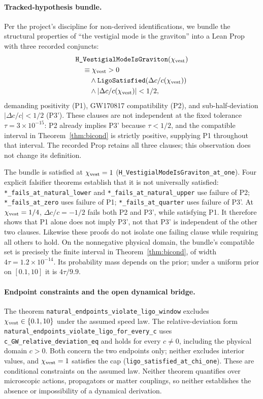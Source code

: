 \documentclass[aps,prl,reprint,nofootinbib,superscriptaddress]{revtex4-2}
\newcommand{\chivest}{\chi_{\rm vest}}
\newcommand{\dccap}{\Delta c/c}
\begin{document}
\paragraph{Tracked-hypothesis bundle.} Per the project's discipline
for non-derived identifications, we bundle the structural properties
of ``the vestigial mode is the graviton'' into a Lean Prop with
three recorded conjuncts:
\begin{equation*}
  \begin{aligned}
    &\verb|H_VestigialModeIsGraviton|(\chivest) \\
    &\quad \equiv \chivest > 0 \\
    &\qquad \wedge \verb|LigoSatisfied|(\dccap(\chivest)) \\
    &\qquad \wedge |\dccap(\chivest)| < 1/2,
  \end{aligned}
\end{equation*}
demanding positivity (P1), GW170817 compatibility (P2), and
sub-half-deviation $|\dccap| < 1/2$ (P3'). These clauses are not
independent at the fixed tolerance $\tau=3\times10^{-15}$:
P2 already implies P3' because $\tau<1/2$, and the compatible
interval in Theorem~\ref{thm:bicond} is strictly positive, supplying
P1 throughout that interval. The recorded Prop retains all three
clauses; this observation does not change its definition.

The bundle is satisfied at $\chivest=1$
(\texttt{H\_VestigialModeIsGraviton\_at\_one}). Four explicit
falsifier theorems establish that it is not universally satisfied:
\verb|*_fails_at_natural_lower| and \verb|*_fails_at_natural_upper|
use failure of P2; \verb|*_fails_at_zero| uses failure of P1;
\verb|*_fails_at_quarter| uses failure of P3'. At $\chivest=1/4$,
$\dccap=-1/2$ fails both P2 and P3', while satisfying P1.
It therefore shows that P1 alone does not imply P3', not that P3'
is independent of the other two clauses. Likewise these proofs do
not isolate one failing clause while requiring all others to hold.
On the nonnegative physical domain, the bundle's compatible set is
precisely the finite interval in Theorem~\ref{thm:bicond}, of width
$4\tau=1.2\times10^{-14}$. Its probability mass depends on the prior;
under a uniform prior on $[0.1,10]$ it is $4\tau/9.9$.

\paragraph{Endpoint constraints and the open dynamical bridge.}
The theorem \texttt{natural\_endpoints\_violate\_ligo\_window}
excludes $\chivest\in\{0.1,10\}$ under the assumed speed law.
The relative-deviation form
\texttt{natural\_endpoints\_violate\_ligo\_for\_every\_c}
uses \texttt{c\_GW\_relative\_deviation\_eq} and holds for every
$c\ne0$, including the physical domain $c>0$. Both concern the
two endpoints only; neither excludes interior values, and
$\chivest=1$ satisfies the cap
(\texttt{ligo\_satisfied\_at\_chi\_one}). These are conditional
constraints on the assumed law. Neither theorem quantifies over
microscopic actions, propagators or matter couplings, so neither
establishes the absence or impossibility of a dynamical derivation.
\end{document}
